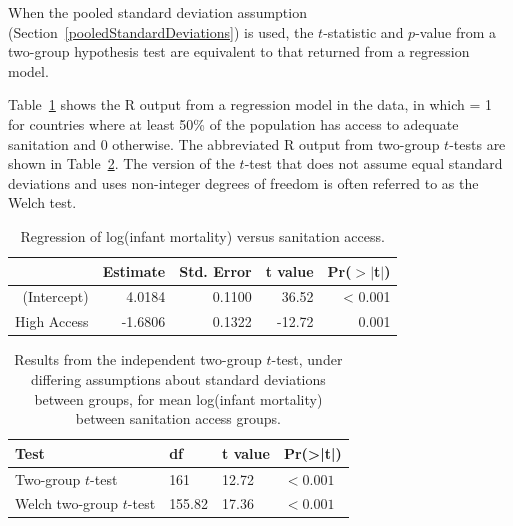 When the pooled standard deviation assumption (Section~\ref{pooledStandardDeviations}) is used, the $t$-statistic and $p$-value from a two-group hypothesis test are equivalent to that returned from a regression model.

Table~\ref{regressLogInfMortAccess} shows the \textsf{R} output from a regression model in the  data, in which  = 1 for countries where at least 50\% of the population has access to adequate sanitation and 0 otherwise. The abbreviated \textsf{R} output from two-group $t$-tests are shown in Table~\ref{tTestSanitStd}. The version of the $t$-test that does not assume equal standard deviations and uses non-integer degrees of freedom is often referred to as the Welch test.

\begin{table}[ht]
\centering
\begin{tabular}{rrrrr}
  \hline
 & Estimate & Std. Error & t value & Pr($>$$|$t$|$) \\ 
  \hline
(Intercept) & 4.0184 & 0.1100 & 36.52 & < 0.001 \\ 
  High Access & -1.6806 & 0.1322 & -12.72 & 0.001 \\ 
   \hline
\end{tabular}
\caption{Regression of log(infant mortality) versus sanitation access.} 
\label{regressLogInfMortAccess}
\end{table}



\begin{table}[ht]
	\centering
	\begin{tabular}{llll}
		\hline
		Test & df & t value & Pr(>|t|) \\ 
		\hline
		Two-group $t$-test & 161 & 12.72 & $< 0.001$ \\ 
		Welch two-group $t$-test & 155.82 & 17.36 & $< 0.001$ \\
		\hline
	\end{tabular}
	\caption{Results from the independent two-group $t$-test, under differing assumptions about standard deviations between groups, for mean log(infant mortality) between sanitation access groups.} 
	\label{tTestSanitStd}
\end{table}

